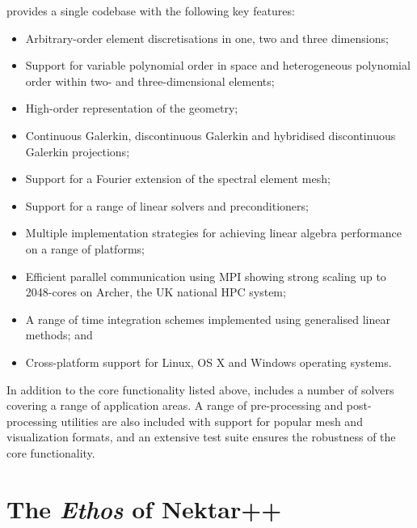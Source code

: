 \nek{} provides a single codebase with the following key features:
\begin{itemize}
  \item Arbitrary-order \shp{} element discretisations in one, two and three
  dimensions;
  \item Support for variable polynomial order in space and heterogeneous
  polynomial order within two- and three-dimensional elements;
  \item High-order representation of the geometry;
  \item Continuous Galerkin, discontinuous Galerkin and hybridised discontinuous
  Galerkin projections;
  \item Support for a Fourier extension of the spectral element mesh;
  \item Support for a range of linear solvers and preconditioners;
  \item Multiple implementation strategies for achieving linear algebra
  performance on a range of platforms;
  \item Efficient parallel communication using MPI showing strong scaling up to
  2048-cores on Archer, the UK national HPC system;
  \item A range of time integration schemes implemented using generalised linear
  methods; and
  \item Cross-platform support for Linux, OS X and Windows operating
  systems.
\end{itemize}

In addition to the core functionality listed above, \nek{} includes a
number of solvers covering a range of application areas. A range
of pre-processing and post-processing utilities are also included with support
for popular mesh and visualization formats, and an extensive test suite ensures
the robustness of the core functionality.



\section{The {\em Ethos} of Nektar++}


